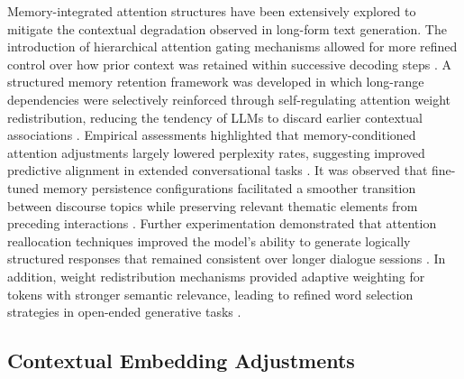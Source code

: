 \documentclass{article}
\begin{document}
Memory-integrated attention structures have been extensively explored to mitigate the contextual degradation observed in long-form text generation. The introduction of hierarchical attention gating mechanisms allowed for more refined control over how prior context was retained within successive decoding steps \cite{mahene2024automated}. A structured memory retention framework was developed in which long-range dependencies were selectively reinforced through self-regulating attention weight redistribution, reducing the tendency of LLMs to discard earlier contextual associations \cite{cakel2024daniel}. Empirical assessments highlighted that memory-conditioned attention adjustments largely lowered perplexity rates, suggesting improved predictive alignment in extended conversational tasks \cite{leonardi2024contextual}. It was observed that fine-tuned memory persistence configurations facilitated a smoother transition between discourse topics while preserving relevant thematic elements from preceding interactions \cite{bernar2024exploring}. Further experimentation demonstrated that attention reallocation techniques improved the model’s ability to generate logically structured responses that remained consistent over longer dialogue sessions \cite{harrington2024mitigating}. In addition, weight redistribution mechanisms provided adaptive weighting for tokens with stronger semantic relevance, leading to refined word selection strategies in open-ended generative tasks \cite{vulpescu2024optimized}.

\subsection{Contextual Embedding Adjustments}
\end{document}
